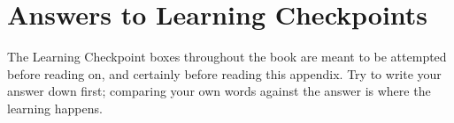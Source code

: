 

\chapter{Answers to Learning Checkpoints}
\label{ch:book2-checkpoint-answers}

The Learning Checkpoint boxes throughout the book are meant to be attempted before reading on, and certainly before reading this appendix. Try to write your answer down first; comparing your own words against the answer is where the learning happens.

\bigskip
